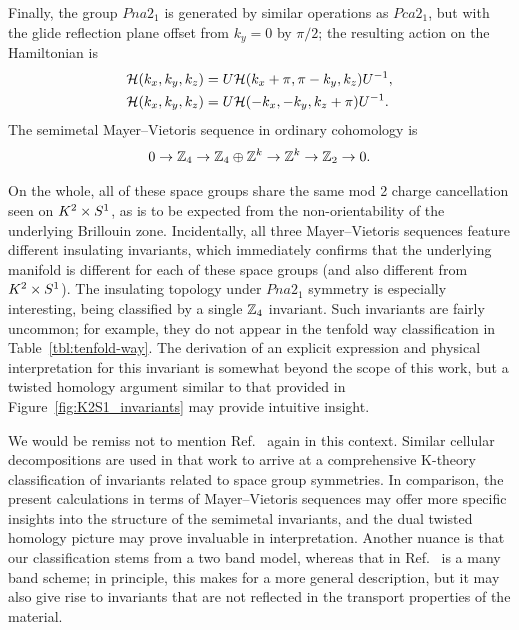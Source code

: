 Finally, the group $Pna2_1$ is generated by similar operations as $Pca2_1$, but with the glide reflection plane offset from $k_y=0$ by $\pi/2$; the resulting action on the Hamiltonian is
\begin{align*}
	\mathcal{H}(k_x, k_y, k_z) &= U\mathcal{H}(k_x+\pi, \pi-k_y, k_z)U^{-1}, \\
	\mathcal{H}(k_x, k_y, k_z) &= U\mathcal{H}(-k_x, -k_y, k_z+\pi)U^{-1}.
\end{align*}
The semimetal Mayer--Vietoris sequence in ordinary cohomology is
\begin{equation*}
	0 \to \mathbb{Z}_4 \to \mathbb{Z}_4\oplus\mathbb{Z}^k \to \mathbb{Z}^k \to \mathbb{Z}_2 \to 0.
\end{equation*}

On the whole, all of these space groups share the same mod 2 charge cancellation seen on $K^2\times S^1$, as is to be expected from the non-orientability of the underlying Brillouin zone. Incidentally, all three Mayer--Vietoris sequences feature different insulating invariants, which immediately confirms that the underlying manifold is different for each of these space groups (and also different from $K^2\times S^1$). The insulating topology under $Pna2_1$ symmetry is especially interesting, being classified by a single $\mathbb{Z}_4$ invariant. Such invariants are fairly uncommon; for example, they do not appear in the tenfold way classification in Table~\ref{tbl:tenfold-way}. The derivation of an explicit expression and physical interpretation for this invariant is somewhat beyond the scope of this work, but a twisted homology argument similar to that provided in Figure~\ref{fig:K2S1_invariants} may provide intuitive insight.

We would be remiss not to mention Ref.~\cite{Shiozaki_AHSS} again in this context. Similar cellular decompositions are used in that work to arrive at a comprehensive K-theory classification of invariants related to space group symmetries. In comparison, the present calculations in terms of Mayer--Vietoris sequences may offer more specific insights into the structure of the semimetal invariants, and the dual twisted homology picture may prove invaluable in interpretation. Another nuance is that our classification stems from a two band model, whereas that in Ref.~\cite{Shiozaki_AHSS} is a many band scheme; in principle, this makes for a more general description, but it may also give rise to invariants that are not reflected in the transport properties of the material.


\label{sec:inversion}

